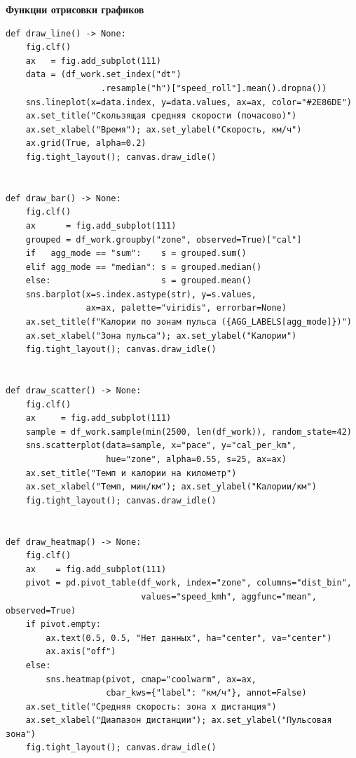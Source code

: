 \documentclass[oneside,a4paper,14pt]{extarticle}
\begin{document}
\newpage
\textbf{Функции отрисовки графиков}
\small
\begin{verbatim}
def draw_line() -> None:
    fig.clf()
    ax   = fig.add_subplot(111)
    data = (df_work.set_index("dt")
                   .resample("h")["speed_roll"].mean().dropna())
    sns.lineplot(x=data.index, y=data.values, ax=ax, color="#2E86DE")
    ax.set_title("Скользящая средняя скорости (почасово)")
    ax.set_xlabel("Время"); ax.set_ylabel("Скорость, км/ч")
    ax.grid(True, alpha=0.2)
    fig.tight_layout(); canvas.draw_idle()


def draw_bar() -> None:
    fig.clf()
    ax      = fig.add_subplot(111)
    grouped = df_work.groupby("zone", observed=True)["cal"]
    if   agg_mode == "sum":    s = grouped.sum()
    elif agg_mode == "median": s = grouped.median()
    else:                      s = grouped.mean()
    sns.barplot(x=s.index.astype(str), y=s.values,
                ax=ax, palette="viridis", errorbar=None)
    ax.set_title(f"Калории по зонам пульса ({AGG_LABELS[agg_mode]})")
    ax.set_xlabel("Зона пульса"); ax.set_ylabel("Калории")
    fig.tight_layout(); canvas.draw_idle()


def draw_scatter() -> None:
    fig.clf()
    ax     = fig.add_subplot(111)
    sample = df_work.sample(min(2500, len(df_work)), random_state=42)
    sns.scatterplot(data=sample, x="pace", y="cal_per_km",
                    hue="zone", alpha=0.55, s=25, ax=ax)
    ax.set_title("Темп и калории на километр")
    ax.set_xlabel("Темп, мин/км"); ax.set_ylabel("Калории/км")
    fig.tight_layout(); canvas.draw_idle()


def draw_heatmap() -> None:
    fig.clf()
    ax    = fig.add_subplot(111)
    pivot = pd.pivot_table(df_work, index="zone", columns="dist_bin",
                           values="speed_kmh", aggfunc="mean", observed=True)
    if pivot.empty:
        ax.text(0.5, 0.5, "Нет данных", ha="center", va="center")
        ax.axis("off")
    else:
        sns.heatmap(pivot, cmap="coolwarm", ax=ax,
                    cbar_kws={"label": "км/ч"}, annot=False)
    ax.set_title("Средняя скорость: зона x дистанция")
    ax.set_xlabel("Диапазон дистанции"); ax.set_ylabel("Пульсовая зона")
    fig.tight_layout(); canvas.draw_idle()
\end{verbatim}
\end{document}
